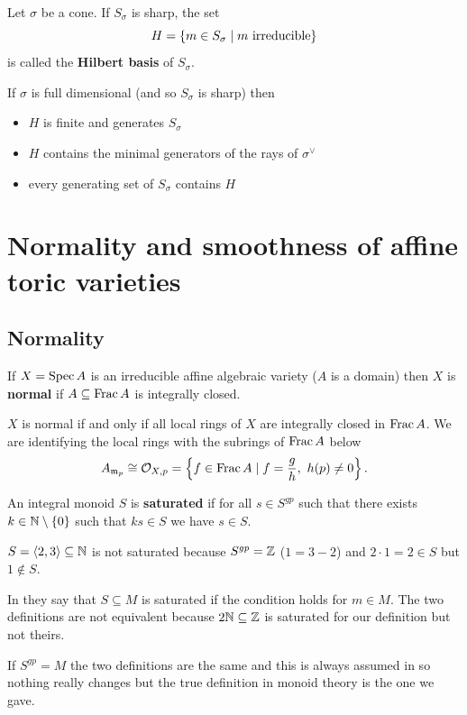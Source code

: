 \begin{definition}[]
Let $\sigma$ be a cone. If $S_\sigma$ is sharp, the set 
\[H=\left\{{m\in S_\sigma\mid m\text{ irreducible}}\right\}\]
is called the \textbf{Hilbert basis} of $S_\sigma$.
\end{definition}


\begin{fact}
If $\sigma$ is full dimensional (and so $S_\sigma$ is sharp) then
\begin{itemize}
\item $H$ is finite and generates $S_\sigma$
	\item $H$ contains the minimal generators of the rays of $\sigma^\vee$
	\item every generating set of $S_\sigma$ contains $H$
\end{itemize}
\end{fact}


\section{Normality and smoothness of affine toric varieties}
\subsection{Normality}
\begin{definition}[]
If $X=\operatorname{Spec} A$ is an irreducible affine algebraic variety ($A$ is a domain) then $X$ is \textbf{normal} if $A\subseteq \operatorname{Frac} A$ is integrally closed.
\end{definition}

\begin{remark}
$X$ is normal if and only if all local rings of $X$ are integrally closed in $\operatorname{Frac} A$. We are identifying the local rings with the subrings of $\operatorname{Frac} A$ below
\[A_{\mathfrak{m}_p}\cong \mathcal{O}_{X,p}=\left\{{f\in \operatorname{Frac} A\mid f=\frac gh,\ h(p)\neq 0}\right\}.\]
\end{remark}

\begin{definition}[]
An integral monoid $S$ is \textbf{saturated} if for all $s\in S^{gp}$ such that there exists $k\in \mathbb{N}\setminus\{0\}$ such that $ks\in S$ we have $s\in S$.
\end{definition}

\begin{example}
$S=\left\langle {2,3}\right\rangle\subseteq \mathbb{N}$ is not saturated because $S^{gp}=\mathbb{Z}$ ($1=3-2$) and $2\cdot 1=2\in S$ but $1\notin S$.
\end{example}

\begin{remark}
In \cite{cox2011toric} they say that $S\subseteq M$ is saturated if the condition holds for $m\in M$. The two definitions are not equivalent because $2\mathbb{N}\subseteq\mathbb{Z}$ is saturated for our definition but not theirs.

If $S^{gp}=M$ the two definitions are the same and this is always assumed in \cite{cox2011toric} so nothing really changes but the true definition in monoid theory is the one we gave.
\end{remark}

